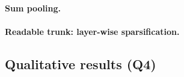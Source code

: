 \paragraph{Sum pooling.}


\paragraph{Readable trunk: layer-wise sparsification.}



\subsection{Qualitative results (Q4)}
\label{sec:exp:qualitative}







